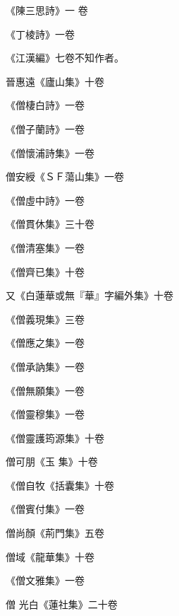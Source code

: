 \begin{pinyinscope}
 《陳三思詩》一
 卷



 《丁棱詩》一卷



 《江漢編》七卷不知作者。



 晉惠遠《廬山集》十卷



 《僧棲白詩》一卷



 《僧子蘭詩》一卷



 《僧懷浦詩集》一卷



 僧安綬《ＳＦ蕩山集》一卷



 《僧虛中詩》一卷



 《僧貫休集》三十卷



 《僧清塞集》一卷



 《僧齊已集》十卷



 又《白蓮華或無『華』字編外集》十卷



 《僧義現集》三卷



 《僧應之集》一卷



 《僧承訥集》一卷



 《僧無願集》一卷



 《僧靈穆集》一卷



 《僧靈護筠源集》十卷


僧可朋《玉
 集》十卷



 《僧自牧《括囊集》十卷



 《僧賓付集》一卷



 僧尚顏《荊門集》五卷



 僧域《龍華集》十卷



 《僧文雅集》一卷



 僧
 光白《蓮社集》二十卷




\end{pinyinscope}
